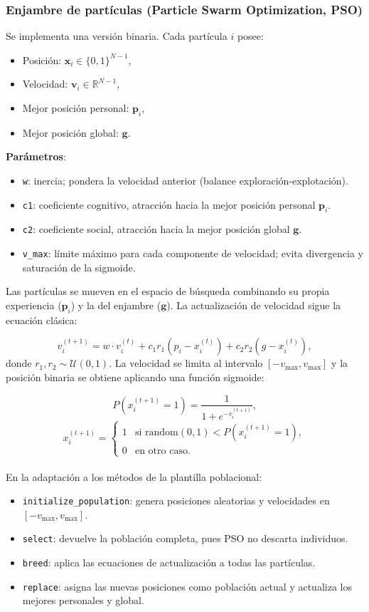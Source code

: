 \documentclass[letterpaper, 12pt]{report}
\begin{document}
\subsubsection{Enjambre de partículas (Particle Swarm Optimization, PSO)}

Se implementa una versión binaria. Cada partícula \(i\) posee:
\begin{itemize}
    \item Posición: \(\mathbf{x}_i \in \{0,1\}^{N-1}\),
    \item Velocidad: \(\mathbf{v}_i \in \mathbb{R}^{N-1}\),
    \item Mejor posición personal: \(\mathbf{p}_i\),
    \item Mejor posición global: \(\mathbf{g}\).
\end{itemize}

\textbf{Parámetros}:
\begin{itemize}
    \item \texttt{w}: inercia; pondera la velocidad anterior (balance exploración-explotación).
    \item \texttt{c1}: coeficiente cognitivo, atracción hacia la mejor posición personal \(\mathbf{p}_i\).
    \item \texttt{c2}: coeficiente social, atracción hacia la mejor posición global \(\mathbf{g}\).
    \item \texttt{v\_max}: límite máximo para cada componente de velocidad; evita divergencia y saturación de la sigmoide.
\end{itemize}

Las partículas se mueven en el espacio de búsqueda combinando su propia experiencia (\(\mathbf{p}_i\)) y la del enjambre (\(\mathbf{g}\)). La actualización de velocidad sigue la ecuación clásica:

\[
v_{i}^{(t+1)} = w \cdot v_{i}^{(t)} + c_1 r_1 (p_i - x_i^{(t)}) + c_2 r_2 (g - x_i^{(t)}),
\]
donde \(r_1, r_2 \sim \mathcal{U}(0,1)\). La velocidad se limita al intervalo \([-v_{\max}, v_{\max}]\) y la posición binaria se obtiene aplicando una función sigmoide:

\[
P(x_{i}^{(t+1)} = 1) = \frac{1}{1 + e^{-v_{i}^{(t+1)}}},
\]
\[
x_{i}^{(t+1)} = 
\begin{cases}
1 & \text{si } \text{random}(0,1) < P(x_{i}^{(t+1)} = 1), \\
0 & \text{en otro caso.}
\end{cases}
\] \\

En la adaptación a los métodos de la plantilla poblacional:
\begin{itemize}
    \item \texttt{initialize\_population}: genera posiciones aleatorias y velocidades en \([-v_{\max}, v_{\max}]\).
    \item \texttt{select}: devuelve la población completa, pues PSO no descarta individuos.
    \item \texttt{breed}: aplica las ecuaciones de actualización a todas las partículas.
    \item \texttt{replace}: asigna las nuevas posiciones como población actual y actualiza los mejores personales y global.
\end{itemize}
\end{document}
